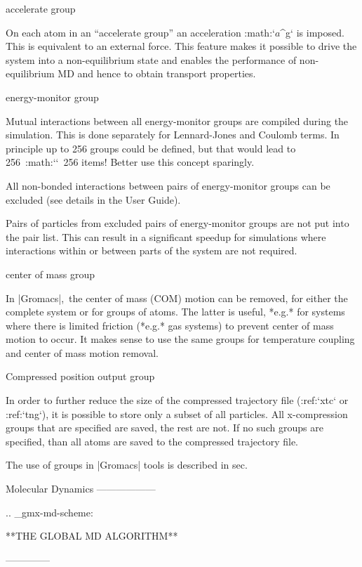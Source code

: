 accelerate group

    On each atom in an “accelerate group” an acceleration
    :math:`{\mbox{\boldmath ${a}$}}^g` is imposed. This is equivalent to
    an external force. This feature makes it possible to drive the
    system into a non-equilibrium state and enables the performance of
    non-equilibrium
    MD
    and hence to obtain transport properties.

energy-monitor group

    Mutual interactions between all energy-monitor groups are compiled
    during the simulation. This is done separately for Lennard-Jones and
    Coulomb terms. In principle up to 256 groups could be defined, but
    that would lead to 256\ :math:`\times`\ 256 items! Better use this
    concept sparingly.

    All non-bonded interactions between pairs of energy-monitor groups
    can be excluded
    (see details in the User Guide).

    Pairs of particles from excluded
    pairs of energy-monitor groups are not put into the pair list. This
    can result in a significant speedup for simulations where
    interactions within or between parts of the system are not required.

center of mass group

    In |Gromacs|, the center of mass (COM) motion can be removed, for
    either the complete system or for groups of atoms. The latter is
    useful, *e.g.* for systems where there is limited friction (*e.g.*
    gas systems) to prevent center of mass motion to occur. It makes
    sense to use the same groups for temperature coupling and center of
    mass motion removal.

Compressed position output group

    In order to further reduce the size of the compressed trajectory
    file (:ref:`xtc` or
    :ref:`tng`), it is possible to
    store only a subset of all particles. All x-compression groups that
    are specified are saved, the rest are not. If no such groups are
    specified, than all atoms are saved to the compressed trajectory
    file.

The use of groups in |Gromacs| tools is described in
sec. 

Molecular Dynamics
------------------

.. _gmx-md-scheme:

**THE GLOBAL MD ALGORITHM**

--------------

